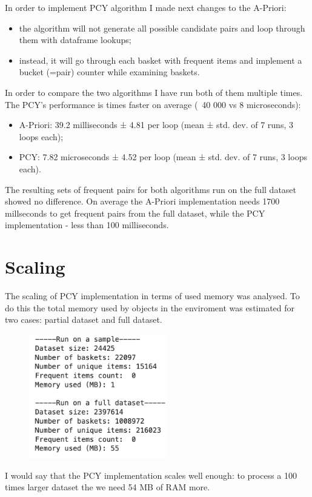 In order to implement PCY algorithm I made next changes to the A-Priori:
\begin{itemize}
	\item the algorithm will not generate all possible candidate pairs and loop through them with dataframe lookups;
	\item instead, it will go through each basket with frequent items and implement a bucket (=pair) counter while examining baskets.
\end{itemize}

In order to compare the two algorithms I have run both of them multiple times. The PCY's performance is times faster on average (~40 000 vs 8 microseconds):

\begin{itemize}
	\item A-Priori: 39.2 milliseconds ± 4.81 per loop (mean ± std. dev. of 7 runs, 3 loops each);
	\item PCY: 7.82 microseconds ± 4.52 per loop (mean ± std. dev. of 7 runs, 3 loops each).
\end{itemize}

The resulting sets of frequent pairs for both algorithms run on the full dataset showed no difference.
On average the A-Priori implementation needs 1700 millseconds to get frequent pairs from the full dataset, while the PCY implementation - less than 100 milliseconds. 

\section{Scaling}

The scaling of PCY implementation in terms of used memory was analysed. To do this the total memory used by objects in the enviroment was estimated for two cases: partial dataset and full dataset.

\begin{figure}[h]
	\includegraphics[width=6cm]{images/4-memory_tests}
\centering
\end{figure}

I would say that the PCY implementation scales well enough:
to process a 100 times larger dataset the we need 54 MB of RAM more.


